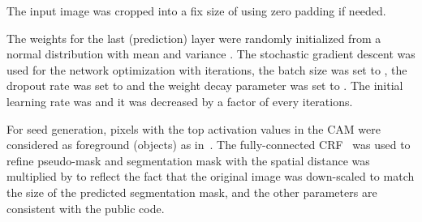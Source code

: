  The input image was cropped into a fix size of  using zero padding if needed.

 The weights for the last (prediction) layer were randomly initialized from a normal distribution with mean  and variance . The stochastic gradient descent was used for the network optimization with  iterations, the batch size was set to , the dropout rate was set to  and the weight decay parameter was set to . The initial learning rate was  and it was decreased by a factor of  every  iterations.

 For seed generation, pixels with the top  activation values in the CAM were considered as foreground (objects) as in~\cite{zhou2016learning}. The fully-connected CRF~\cite{krahenbuhl2011efficient} was used to refine pseudo-mask and segmentation mask with the spatial distance was multiplied by  to reflect the fact that the original image was down-scaled to match the size of the predicted segmentation mask, and the other parameters are consistent with the public code.

